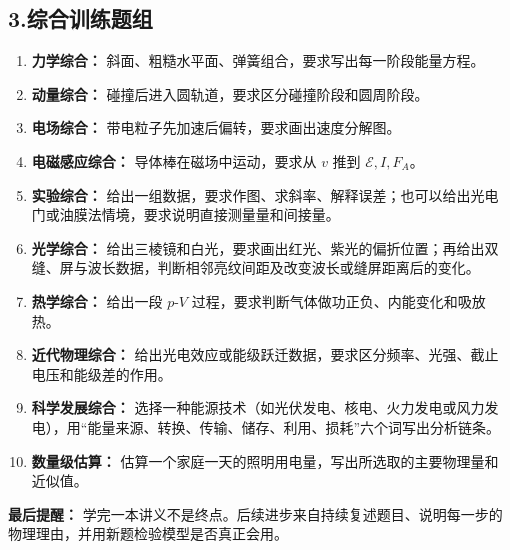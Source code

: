 \subsection*{3.\quad 综合训练题组}

\begin{enumerate}
  \item \textbf{力学综合：} 斜面、粗糙水平面、弹簧组合，要求写出每一阶段能量方程。
  \begin{center}
  
  \end{center}
  \item \textbf{动量综合：} 碰撞后进入圆轨道，要求区分碰撞阶段和圆周阶段。
  \item \textbf{电场综合：} 带电粒子先加速后偏转，要求画出速度分解图。
  \begin{center}
  
  \end{center}
  \item \textbf{电磁感应综合：} 导体棒在磁场中运动，要求从 $v$ 推到 $\mathcal E,I,F_A$。
  \begin{center}
  
  \end{center}
  \item \textbf{实验综合：} 给出一组数据，要求作图、求斜率、解释误差；也可以给出光电门或油膜法情境，要求说明直接测量量和间接量。
  \item \textbf{光学综合：} 给出三棱镜和白光，要求画出红光、紫光的偏折位置；再给出双缝、屏与波长数据，判断相邻亮纹间距及改变波长或缝屏距离后的变化。
  \item \textbf{热学综合：} 给出一段 $p$-$V$ 过程，要求判断气体做功正负、内能变化和吸放热。
  \item \textbf{近代物理综合：} 给出光电效应或能级跃迁数据，要求区分频率、光强、截止电压和能级差的作用。
  \item \textbf{科学发展综合：} 选择一种能源技术（如光伏发电、核电、火力发电或风力发电），用“能量来源、转换、传输、储存、利用、损耗”六个词写出分析链条。
  \item \textbf{数量级估算：} 估算一个家庭一天的照明用电量，写出所选取的主要物理量和近似值。
\end{enumerate}

\textbf{最后提醒：} 学完一本讲义不是终点。后续进步来自持续复述题目、说明每一步的物理理由，并用新题检验模型是否真正会用。

\newpage
